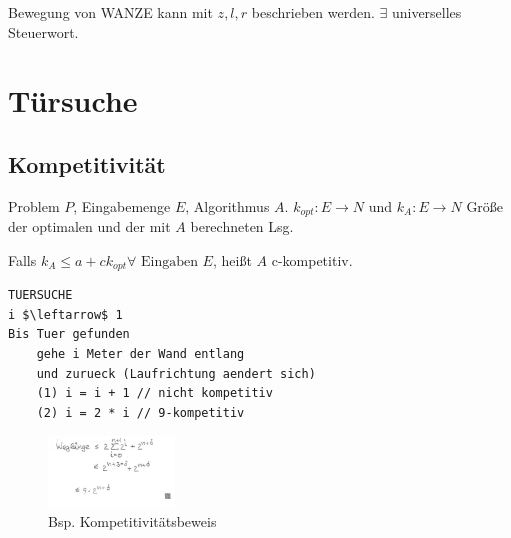 \documentclass[8pt, DIV15, twocolumn]{scrartcl}
\begin{document}
Bewegung von WANZE kann mit $z,l,r$ beschrieben werden. $\exists$ universelles Steuerwort.

\section*{Türsuche}
\subsection*{Kompetitivität}
Problem $P$, Eingabemenge $E$, Algorithmus $A$. $k_{opt}: E \rightarrow N \text{ und } k_A: E \rightarrow N$ Größe der optimalen und der mit $A$ berechneten Lsg. 

Falls $k_A \leq a + c k_{opt} \forall \text{ Eingaben } E$, heißt $A$ c-kompetitiv.

\begin{lstlisting}[mathescape=true]
TUERSUCHE
i $\leftarrow$ 1
Bis Tuer gefunden
	gehe i Meter der Wand entlang
	und zurueck (Laufrichtung aendert sich)
	(1) i = i + 1 // nicht kompetitiv
	(2) i = 2 * i // 9-kompetitiv
\end{lstlisting}


\begin{figure}[ht]
	\centering
  \includegraphics[width=0.3\textwidth]{9-kompetiv-beweis.png}
  \caption{Bsp. Kompetitivitätsbeweis}
\end{figure}
\end{document}
